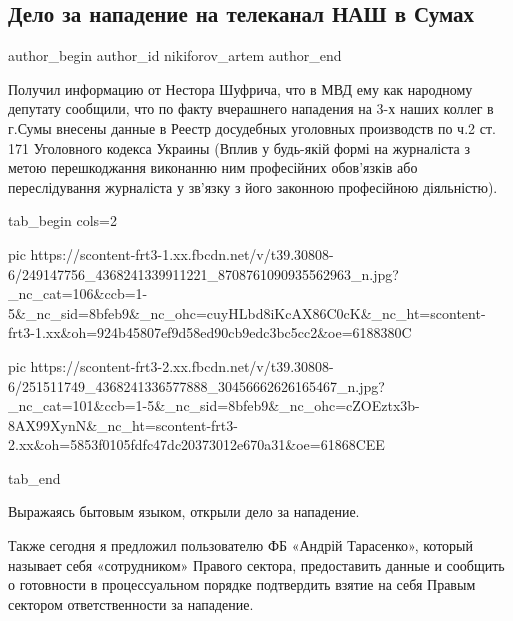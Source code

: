  
 
 
 
 
 
\subsection{Дело за нападение на телеканал НАШ в Сумах}
\label{sec:31_10_2021.fb.nikiforov_artem.1.napadenie_nash_delo}
 
\ifcmt
 author_begin
   author_id nikiforov_artem
 author_end
\fi

Получил информацию от Нестора Шуфрича, что в МВД ему как народному депутату
сообщили, что по факту вчерашнего нападения на 3-х наших коллег в г.Сумы
внесены данные в Реестр досудебных уголовных производств по ч.2 ст. 171
Уголовного кодекса Украины (Вплив у будь-якій формі на журналіста з метою
перешкоджання виконанню ним професійних обов’язків або переслідування
журналіста у зв’язку з його законною професійною діяльністю).

\ifcmt
  tab_begin cols=2

     pic https://scontent-frt3-1.xx.fbcdn.net/v/t39.30808-6/249147756_4368241339911221_8708761090935562963_n.jpg?_nc_cat=106&ccb=1-5&_nc_sid=8bfeb9&_nc_ohc=cuyHLbd8iKcAX86C0cK&_nc_ht=scontent-frt3-1.xx&oh=924b45807ef9d58ed90cb9edc3bc5cc2&oe=6188380C

     pic https://scontent-frt3-2.xx.fbcdn.net/v/t39.30808-6/251511749_4368241336577888_30456662626165467_n.jpg?_nc_cat=101&ccb=1-5&_nc_sid=8bfeb9&_nc_ohc=cZOEztx3b-8AX99XynN&_nc_ht=scontent-frt3-2.xx&oh=5853f0105fdfc47dc20373012e670a31&oe=61868CEE

  tab_end
\fi

Выражаясь бытовым языком, открыли дело за нападение. 

Также сегодня я предложил пользователю ФБ «Андрій Тарасенко», который называет
себя «сотрудником» Правого сектора, предоставить данные и сообщить о готовности
в процессуальном порядке подтвердить взятие на себя Правым сектором
ответственности за нападение.

